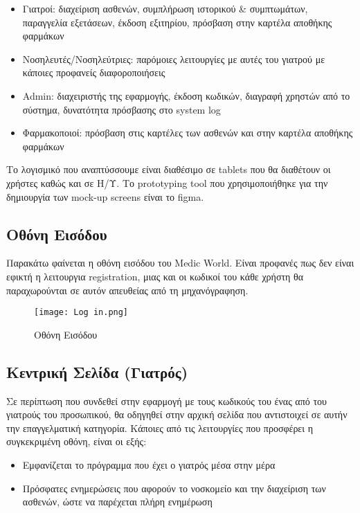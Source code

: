 \documentclass{article}
\begin{document}
\begin{itemize}
  \item Γιατροί: διαχείριση ασθενών, συμπλήρωση ιστορικού \& συμπτωμάτων, παραγγελία εξετάσεων, έκδοση εξιτηρίου, πρόσβαση στην καρτέλα αποθήκης φαρμάκων
  \item Νοσηλευτές/Νοσηλεύτριες: παρόμοιες λειτουργίες με αυτές του γιατρού με κάποιες προφανείς διαφοροποιήσεις
  \item Admin: διαχειριστής της εφαρμογής, έκδοση κωδικών, διαγραφή χρηστών από το σύστημα, δυνατότητα πρόσβασης στο system log
  \item Φαρμακοποιοί: πρόσβαση στις καρτέλες των ασθενών και στην καρτέλα αποθήκης φαρμάκων
\end{itemize}

Το λογισμικό που αναπτύσσουμε είναι διαθέσιμο σε tablets που θα διαθέτουν οι χρήστες καθώς και σε Η/Υ. Το prototyping tool που χρησιμοποιήθηκε για την δημιουργία των mock-up screens είναι το figma.

\subsection{Οθόνη Εισόδου}

Παρακάτω φαίνεται η οθόνη εισόδου του Medic World. Είναι προφανές πως δεν είναι εφικτή η λειτουργια registration, μιας και οι κωδικοί του κάθε χρήστη θα παραχωρούνται σε αυτόν απευθείας από τη μηχανόγραφηση.

\vspace{0.3cm}

\begin{figure}[!htb]
\centering
\texttt{[image: Log in.png]}
\caption{\label{fig:log in page} Οθόνη Εισόδου}
\end{figure}

\newpage

\subsection{Κεντρική Σελίδα (Γιατρός)}

Σε περίπτωση που συνδεθεί στην εφαρμογή με τους κωδικούς του ένας από του γιατρούς του προσωπικού, θα οδηγηθεί στην αρχική σελίδα που αντιστοιχεί σε αυτήν την επαγγελματική κατηγορία. Κάποιες από τις λειτουργίες που προσφέρει η συγκεκριμένη οθόνη, είναι οι εξής:

\begin{itemize}
  \item Εμφανίζεται το πρόγραμμα που έχει ο γιατρός μέσα στην μέρα
  \item Πρόσφατες ενημερώσεις που αφορούν το νοσκομείο και την διαχείριση των ασθενών, ώστε να παρέχεται πλήρη ενημέρωση
\end{itemize}
\end{document}
